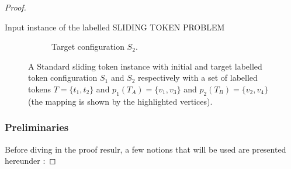 \begin{proof}
\begin{example}{Input instance of the labelled SLIDING TOKEN PROBLEM}
\begin{figure}[H]
\begin{subfigure}[b]{0.4\textwidth}
\begin{scaletikzpicturetowidth}{\textwidth}
      \end{scaletikzpicturetowidth}
      \caption{Target configuration $S_{2}$.}
      \label{fig:standard_2}
    \end{subfigure}
    \caption{A Standard sliding token instance with initial and target labelled token configuration $S_{1}$ and $S_{2}$ respectively with a
    set of labelled tokens $T = \{t_1, t_2\}$ and $p_{1}(T_{A}) = \{v_1, v_3\}$ and $p_{2}(T_{B}) = \{v_2, v_4\}$ (the mapping is shown by
    the highlighted vertices).}
    \label{fig:input_instance_standard}
  \end{figure}
\end{example}

\subsubsection{Preliminaries} \label{subsubsection:prelim}
Before diving in the proof resulr, a few notions that will be used are presented hereunder :

\end{proof}

